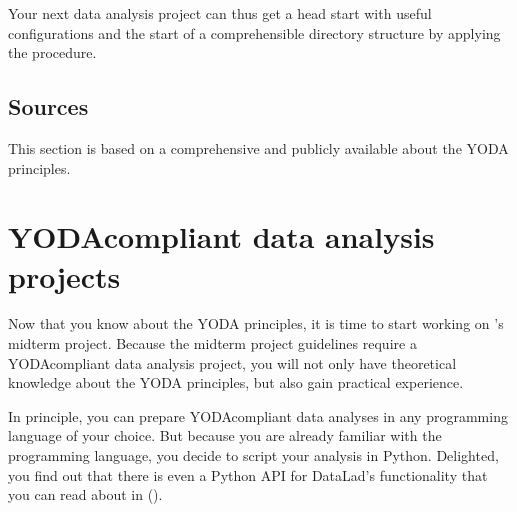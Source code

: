 \sphinxAtStartPar
Your next data analysis project can thus get a head start with useful configurations
and the start of a comprehensible directory structure by applying the  procedure.


\subsection{Sources}
\label{\detokenize{basics/101-127-yoda:sources}}
\sphinxAtStartPar
This section is based on a comprehensive
 and publicly
available  about the
YODA principles.

\sphinxstepscope

\ignorespaces 

\section{YODA\sphinxhyphen{}compliant data analysis projects}
\label{\detokenize{basics/101-130-yodaproject:yoda-compliant-data-analysis-projects}}\label{\detokenize{basics/101-130-yodaproject:yoda-project}}\label{\detokenize{basics/101-130-yodaproject:index-0}}\label{\detokenize{basics/101-130-yodaproject::doc}}
\sphinxAtStartPar
Now that you know about the YODA principles, it is time to start working on
’s midterm project. Because the midterm project guidelines
require a YODA\sphinxhyphen{}compliant data analysis project, you will not only have theoretical
knowledge about the YODA principles, but also gain practical experience.

\sphinxAtStartPar
In principle, you can prepare YODA\sphinxhyphen{}compliant data analyses in any programming
language of your choice. But because you are already familiar with
the  programming language, you decide
to script your analysis in Python. Delighted, you find out that there is even
a Python API for DataLad’s functionality that you can read about in {\hyperref[\detokenize{basics/101-130-yodaproject:fom-pythonapi}]{}} ().

